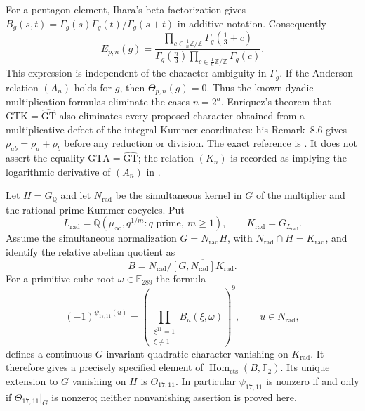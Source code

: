 For a pentagon element, Ihara's beta factorization gives
$B_g(s,t)=\Gamma_g(s)\Gamma_g(t)/\Gamma_g(s+t)$ in additive
notation.  Consequently
\begin{equation}
 E_{p,n}(g)=
 \frac{\displaystyle\prod_{c\in\frac1n\mathbb Z/\mathbb Z}
                    \Gamma_g(\tfrac13+c)}
      {\displaystyle\Gamma_g(\tfrac n3)
          \prod_{c\in\frac1n\mathbb Z/\mathbb Z}\Gamma_g(c)}.
 \label{eq:odd-anderson-gamma}
\end{equation}
This expression is independent of the character ambiguity in
$\Gamma_g$.  If the Anderson relation $(A_n)$ holds for $g$, then
$\Theta_{p,n}(g)=0$.  Thus the known dyadic multiplication formulas
eliminate the cases $n=2^a$.  Enriquez's theorem that
$\mathrm{GTK}=\widehat{\mathrm{GT}}$ also eliminates every proposed
character obtained from a multiplicative defect of the integral
Kummer coordinates: his Remark~8.6 gives
$\rho_{ab}=\rho_a+\rho_b$ before any reduction or division.
The exact reference is \cite[Theorem~8.1 and Remark~8.6]{Enriquez2007}.
It does not assert the equality
$\mathrm{GTA}=\widehat{\mathrm{GT}}$; the relation $(K_n)$ is recorded
as implying the logarithmic derivative of $(A_n)$ in
\cite[p.~102]{Furusho2003}.

\begin{corollary}\label{cor:concrete-radical-anderson-character}
Let $H=G_{\mathbb Q}$ and let $N_{\mathrm{rad}}$ be the simultaneous
kernel in $G$ of the multiplier and the rational-prime Kummer cocycles.
Put
\[
 L_{\mathrm{rad}}=\mathbb Q(\mu_\infty,q^{1/m}:
                          q\text{ prime},\ m\geq1),
 \qquad K_{\mathrm{rad}}=G_{L_{\mathrm{rad}}}.
\]
Assume the simultaneous normalization
$G=N_{\mathrm{rad}}H$, with
$N_{\mathrm{rad}}\cap H=K_{\mathrm{rad}}$, and identify the relative
abelian quotient as
\[
 B=N_{\mathrm{rad}}/
       \overline{[G,N_{\mathrm{rad}}]K_{\mathrm{rad}}}.
\]
For a primitive cube root $\omega\in\mathbb F_{289}$ the formula
\begin{equation}
 (-1)^{\psi_{17,11}(u)}=
    \left(\prod_{\substack{\xi^{11}=1\\\xi\ne1}}
                        B_u(\xi,\omega)\right)^9,
 \qquad u\in N_{\mathrm{rad}},
 \label{eq:concrete-radical-anderson-sign}
\end{equation}
defines a continuous $G$-invariant quadratic character vanishing on
$K_{\mathrm{rad}}$.  It therefore gives a precisely specified element
of $\operatorname{Hom}_{\mathrm{cts}}(B,\mathbb F_2)$.
Its unique extension to $G$ vanishing on $H$ is $\Theta_{17,11}$.
In particular $\psi_{17,11}$ is nonzero if and only if
$\Theta_{17,11}|_G$ is nonzero; neither nonvanishing assertion is
proved here.
\end{corollary}


